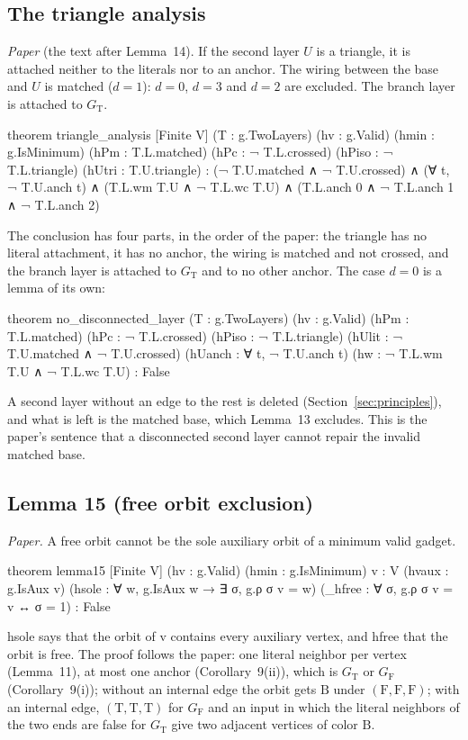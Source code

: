 \documentclass[11pt,a4paper]{article}
\newcommand{\leanus}{\textunderscore\allowbreak}
\newcommand{\lean}[1]{{\ttfamily\let\_\leanus #1}}
\newcommand{\GT}{G_{\mathrm{T}}}
\newcommand{\GF}{G_{\mathrm{F}}}
\newcommand{\T}{\mathrm{T}}
\newcommand{\F}{\mathrm{F}}
\newcommand{\B}{\mathrm{B}}
\begin{document}
\subsection{The triangle analysis}\label{sec:triangle}
\emph{Paper} (the text after Lemma~14). If the second layer $U$ is a
triangle, it is attached neither to the literals nor to an anchor. The
wiring between the base and $U$ is matched ($d=1$): $d=0$, $d=3$ and $d=2$
are excluded. The branch layer is attached to $\GT$.
\begin{code}
theorem triangle_analysis [Finite V] (T : g.TwoLayers) (hv : g.Valid) (hmin : g.IsMinimum)
    (hPm : T.L.matched) (hPc : ¬ T.L.crossed) (hPiso : ¬ T.L.triangle)
    (hUtri : T.U.triangle) :
    (¬ T.U.matched ∧ ¬ T.U.crossed) ∧ (∀ t, ¬ T.U.anch t) ∧
    (T.L.wm T.U ∧ ¬ T.L.wc T.U) ∧ (T.L.anch 0 ∧ ¬ T.L.anch 1 ∧ ¬ T.L.anch 2)
\end{code}
The conclusion has four parts, in the order of the paper: the triangle has
no literal attachment, it has no anchor, the wiring is matched and not
crossed, and the branch layer is attached to $\GT$ and to no other anchor.
The case $d=0$ is a lemma of its own:
\begin{code}
theorem no_disconnected_layer (T : g.TwoLayers) (hv : g.Valid) (hPm : T.L.matched)
    (hPc : ¬ T.L.crossed) (hPiso : ¬ T.L.triangle)
    (hUlit : ¬ T.U.matched ∧ ¬ T.U.crossed) (hUanch : ∀ t, ¬ T.U.anch t)
    (hw : ¬ T.L.wm T.U ∧ ¬ T.L.wc T.U) : False
\end{code}
A second layer without an edge to the rest is deleted
(Section~\ref{sec:principles}), and what is left is the matched base, which
Lemma~13 excludes. This is the paper's sentence that a disconnected second
layer cannot repair the invalid matched base.

\subsection{Lemma 15 (free orbit exclusion)}
\emph{Paper.} A free orbit cannot be the sole auxiliary orbit of a minimum
valid gadget.
\begin{code}
theorem lemma15 [Finite V] (hv : g.Valid) (hmin : g.IsMinimum) {v : V} (hvaux : g.IsAux v)
    (hsole : ∀ w, g.IsAux w → ∃ σ, g.ρ σ v = w) (_hfree : ∀ σ, g.ρ σ v = v ↔ σ = 1) :
    False
\end{code}
\lean{hsole} says that the orbit of \lean{v} contains every auxiliary
vertex, and \lean{\_hfree} that the orbit is free. The proof follows the
paper: one literal neighbor per vertex (Lemma~11), at most one anchor
(Corollary~9(ii)), which is $\GT$ or $\GF$ (Corollary~9(i)); without an
internal edge the orbit gets $\B$ under $(\F,\F,\F)$; with an internal edge,
$(\T,\T,\T)$ for $\GF$ and an input in which the literal neighbors of the
two ends are false for $\GT$ give two adjacent vertices of color $\B$.
\end{document}
